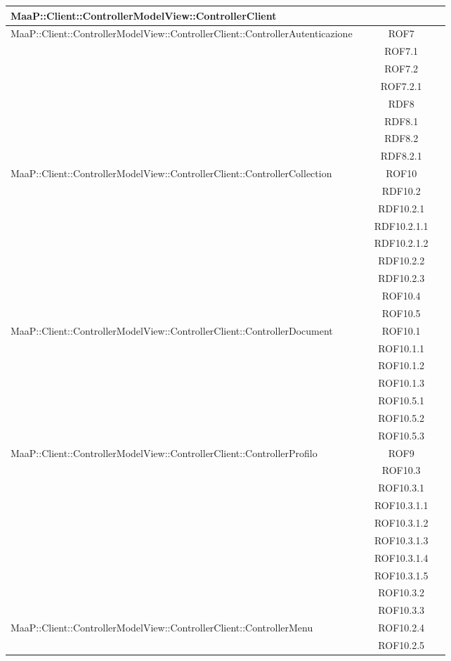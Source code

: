 \begin{center}
\begin{longtable}{|p{0.8\linewidth}|c|}
\midrule 
MaaP::Client::ControllerModelView::ControllerClient
& \\

\midrule 
MaaP::Client::ControllerModelView::ControllerClient::ControllerAutenticazione
& ROF7\\
& ROF7.1\\
& ROF7.2\\
& ROF7.2.1\\
& RDF8\\
& RDF8.1\\
& RDF8.2\\
& RDF8.2.1\\

\midrule 
MaaP::Client::ControllerModelView::ControllerClient::ControllerCollection
& ROF10\\
& RDF10.2\\
& RDF10.2.1\\
& RDF10.2.1.1\\
& RDF10.2.1.2\\
& RDF10.2.2\\
& RDF10.2.3\\
& ROF10.4\\
& ROF10.5\\


\midrule 
MaaP::Client::ControllerModelView::ControllerClient::ControllerDocument
& ROF10.1\\
& ROF10.1.1\\
& ROF10.1.2\\
& ROF10.1.3\\
& ROF10.5.1\\
& ROF10.5.2\\
& ROF10.5.3\\


\midrule 
MaaP::Client::ControllerModelView::ControllerClient::ControllerProfilo
& ROF9\\
& ROF10.3\\
& ROF10.3.1\\
& ROF10.3.1.1\\
& ROF10.3.1.2\\
& ROF10.3.1.3\\
& ROF10.3.1.4\\
& ROF10.3.1.5\\
& ROF10.3.2\\
& ROF10.3.3\\


\midrule 
MaaP::Client::ControllerModelView::ControllerClient::ControllerMenu
& ROF10.2.4\\
& ROF10.2.5\\



\end{longtable}
\end{center}
